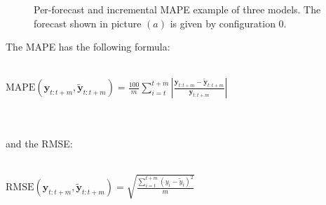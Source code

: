 \documentclass[a4paper, 12pt]{article} %
\begin{document}
	\begin{figure}\centering
		 \hfill
		 \hfill
		
		\caption{Per-forecast and incremental MAPE example of three models. The forecast shown in picture $(a)$ is given by configuration $0$.}
		\label{fig:exp_setup_forecasting}
	\end{figure}
	
	The MAPE has the following formula:\\\\
	\centerline{
		$
		\text{MAPE}(\pmb{y}_{t:t+m}, \tilde{\pmb{y}}_{t:t+m}) = \frac{100}{m} \sum_{i=t}^{t+m} |\frac{\pmb{y}_{t:t+m}-\tilde{\pmb{y}}_{t:t+m}}{\pmb{y}_{t:t+m}}|
		$
	}\\\\
	and the RMSE:\\\\
	\centerline{
		$
		\text{RMSE}(\pmb{y}_{t:t+m}, \tilde{\pmb{y}}_{t:t+m}) = \sqrt{\frac{\sum_{i=t}^{t+m} (y_i - \tilde{y}_i)^2 }{m}}
		$
	}\\\\
	
\end{document}
